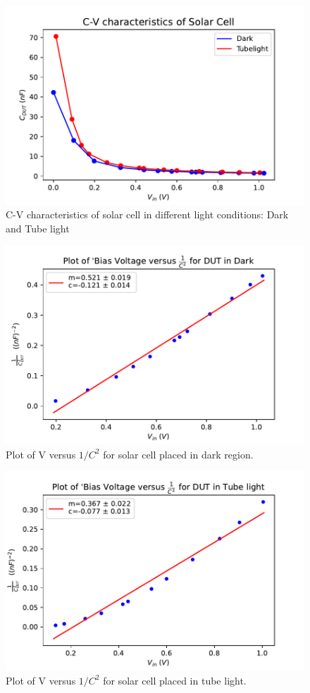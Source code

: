 \documentclass[a4paper, amsfonts, amssymb, amsmath, reprint, showkeys, nofootinbib, twoside]{revtex4-1}
\begin{document}
\begin{figure}[H]
	\centering
	\includegraphics[scale=0.57]{cv}
	\caption{C-V characteristics of solar cell in different light conditions: Dark and Tube light}
	\label{2}
\end{figure}

\begin{figure}[H]
	\centering
	\includegraphics[scale=0.57]{c2vd}
	\caption{Plot of V versus $1/C^{2}$ for solar cell placed in dark region.}
	\label{3}
\end{figure}

\begin{figure}[H]
	\centering
	\includegraphics[scale=0.57]{c2vtb}
	\caption{Plot of V versus $1/C^{2}$ for solar cell placed in tube light.}
	\label{4}
\end{figure}
\end{document}

